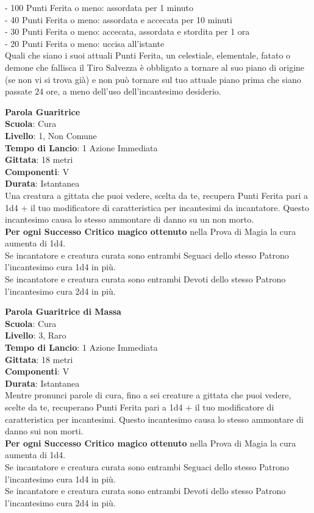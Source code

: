 \begin{multicols}{2}
- 100 Punti Ferita o meno: assordata per 1 minuto\\
- 40 Punti Ferita o meno: assordata e accecata per 10 minuti\\
- 30 Punti Ferita o meno: accecata, assordata e stordita per 1 ora\\
- 20 Punti Ferita o meno: uccisa all'istante\\

Quali che siano i suoi attuali Punti Ferita, un celestiale, elementale, fatato o demone che fallisca il Tiro Salvezza è obbligato a tornare al suo piano di origine (se non vi si trova già) e non può tornare sul tuo attuale piano prima che siano passate 24 ore, a meno dell'uso dell'incantesimo desiderio.

\medskip\textbf{Parola Guaritrice}\\
\textbf{Scuola}: Cura\\
\textbf{Livello}: 1, Non Comune\\
\textbf{Tempo di Lancio}: 1 Azione Immediata\\
\textbf{Gittata}: 18 metri\\
\textbf{Componenti}: V\\
\textbf{Durata}: Istantanea\\
Una creatura a gittata che puoi vedere, scelta da te, recupera Punti Ferita pari a 1d4 + il tuo modificatore di caratteristica per incantesimi da incantatore. Questo incantesimo causa lo stesso ammontare di danno su un non morto.\\
\textbf{Per ogni Successo Critico magico ottenuto} nella Prova di Magia la cura aumenta di 1d4.\\
Se incantatore e creatura curata sono entrambi Seguaci dello stesso Patrono l'incantesimo cura 1d4 in più.\\
Se incantatore e creatura curata sono entrambi Devoti dello stesso Patrono l'incantesimo cura 2d4 in più.

\medskip\textbf{Parola Guaritrice di Massa}\\
\textbf{Scuola}: Cura\\
\textbf{Livello}: 3, Raro\\
\textbf{Tempo di Lancio}: 1 Azione Immediata\\
\textbf{Gittata}: 18 metri\\
\textbf{Componenti}: V\\
\textbf{Durata}: Istantanea\\
Mentre pronunci parole di cura, fino a sei creature a gittata che puoi vedere, scelte da te, recuperano Punti Ferita pari a 1d4 + il tuo modificatore di caratteristica per incantesimi. Questo incantesimo causa lo stesso ammontare di danno sui non morti.\\
\textbf{Per ogni Successo Critico magico ottenuto} nella Prova di Magia la cura aumenta di 1d4.\\
Se incantatore e creatura curata sono entrambi Seguaci dello stesso Patrono l'incantesimo cura 1d4 in più.\\
Se incantatore e creatura curata sono entrambi Devoti dello stesso Patrono l'incantesimo cura 2d4 in più.


\end{multicols}
